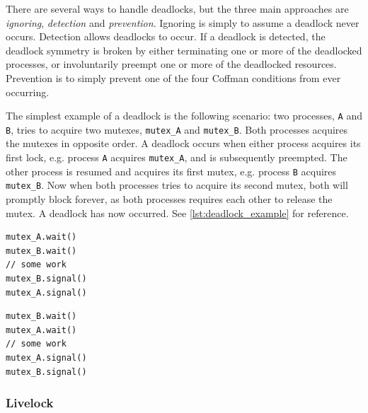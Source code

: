 There are several ways to handle deadlocks, but the three main approaches are \textit{ignoring}, \textit{detection} and \textit{prevention}. Ignoring is simply to assume a deadlock never occurs. Detection allows deadlocks to occur. If a deadlock is detected, the deadlock symmetry is broken by either terminating one or more of the deadlocked processes, or involuntarily preempt one or more of the deadlocked resources. Prevention is to simply prevent one of the four Coffman conditions from ever occurring.

The simplest example of a deadlock is the following scenario: two processes, \texttt{A} and \texttt{B}, tries to acquire two mutexes, \texttt{mutex\_A} and \texttt{mutex\_B}. Both processes acquires the mutexes in opposite order. A deadlock occurs when either process acquires its first lock, e.g. process \texttt{A} acquires \texttt{mutex\_A}, and is subsequently preempted. The other process is resumed and acquires its first mutex, e.g. process \texttt{B} acquires \texttt{mutex\_B}. Now when both processes tries to acquire its second mutex, both will promptly block forever, as both processes requires each other to release the mutex. A deadlock has now occurred. See \cref{lst:deadlock_example} for reference.

\begin{lstfloat}
\noindent\begin{minipage}{0.45\textwidth}
\begin{lstlisting}[title={Process A},style={CustomC},frame={},xleftmargin={4em}]
mutex_A.wait()
mutex_B.wait()
// some work
mutex_B.signal()
mutex_A.signal()
\end{lstlisting}
\end{minipage}
\begin{minipage}{0.45\textwidth}
\begin{lstlisting}[title={Process B},style={CustomC},frame={},xleftmargin={4em}]
mutex_B.wait()
mutex_A.wait()
// some work
mutex_A.signal()
mutex_B.signal()
\end{lstlisting}
\end{minipage}
\label{lst:deadlock_example}
\end{lstfloat}

\subsubsection{Livelock}


